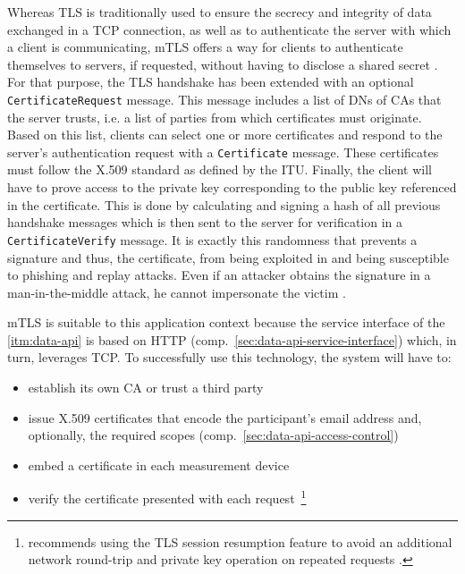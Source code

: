 Whereas \acs{TLS} is traditionally used to ensure the secrecy and integrity of data exchanged in a \acs{TCP} connection, as well as to authenticate the server with which a client is communicating, \acs{mTLS} offers a way for clients to authenticate themselves to servers, if requested, without having to disclose a shared secret \cite[p.~1]{parsovs2013practical}. For that purpose, the \acs{TLS} handshake has been extended with an optional \texttt{CertificateRequest} message. This message includes a list of \acp*{DN} of \acp*{CA} that the server trusts, i.e. a list of parties from which certificates must originate. Based on this list, clients can select one or more certificates and respond to the server's authentication request with a \texttt{Certificate} message. These certificates must follow the X.509 standard as defined by the \acl*{ITU}. Finally, the client will have to prove access to the private key corresponding to the public key referenced in the certificate. This is done by calculating and signing a hash of all previous handshake messages which is then sent to the server for verification in a \texttt{CertificateVerify} message. It is exactly this randomness that prevents a signature and thus, the certificate, from being exploited in and being susceptible to phishing and replay attacks. Even if an attacker obtains the signature in a man-in-the-middle attack, he cannot impersonate the victim \cite[p.~2]{parsovs2013practical}.

\acs{mTLS} is suitable to this application context because the service interface of the \ref{itm:data-api} is based on \acs{HTTP} (comp.~\autoref{sec:data-api-service-interface}) which, in turn, leverages \acs{TCP}. To successfully use this technology, the system will have to:

\begin{itemize}
  \item establish its own \acs*{CA} or trust a third party
  \item issue X.509 certificates that encode the participant's email address and, optionally, the required scopes (comp.~\autoref{sec:data-api-access-control})
  \item embed a certificate in each measurement device
  \item verify the certificate presented with each request~\footnote{\citeauthor{parsovs2013practical} recommends using the \acs{TLS} session resumption feature to avoid an additional network round-trip and private key operation on repeated requests \cite[p.~3]{parsovs2013practical}.}
\end{itemize}

